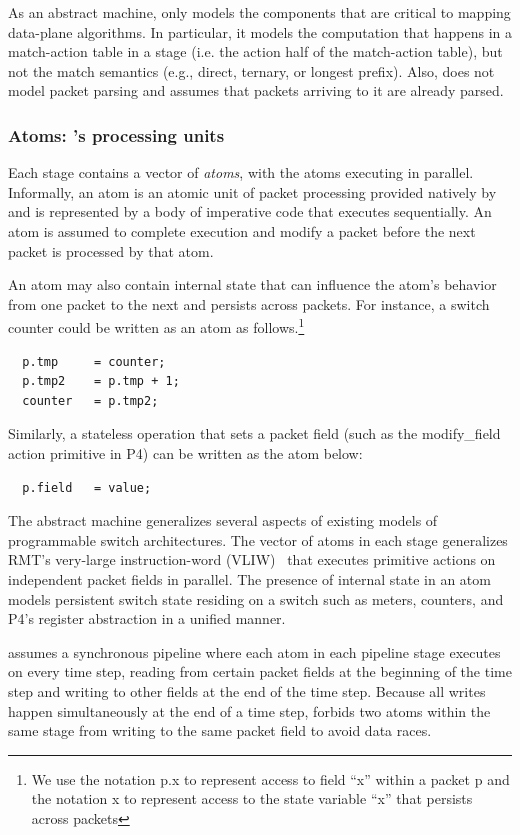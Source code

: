 As an abstract machine, \absmachine only models the components that
are critical to mapping data-plane algorithms. In particular, it
models the computation that happens in a match-action table in a stage
(i.e. the action half of the match-action table), but not the match
semantics (e.g., direct, ternary, or longest prefix). Also,
\absmachine does not model packet parsing and assumes that packets
arriving to it are already parsed.


\subsubsection{Atoms: \absmachine's processing units}

Each stage contains a vector of \textit{atoms}, with the atoms
executing in parallel. Informally, an atom is an atomic unit of packet
processing provided natively by \absmachine and is represented by a body of imperative code that
executes sequentially. An atom is assumed to complete execution and
modify a packet before the next packet is processed by that
atom.

An atom may also contain internal state that can influence the atom's
behavior from one packet to the next and persists across packets. For
instance, a switch counter could be written as an atom as
follows.\footnote{We use the notation p.x to represent access to field
  ``x'' within a packet p and the notation x to represent access to
  the state variable ``x'' that persists across packets}
\begin{verbatim}
  p.tmp     = counter;
  p.tmp2    = p.tmp + 1;
  counter   = p.tmp2;
\end{verbatim}
Similarly, a stateless operation that sets a packet field (such as the
modify\_field action primitive in P4) can be written as the atom
below:
\begin{verbatim}
  p.field   = value;
\end{verbatim}

The \absmachine abstract machine generalizes several aspects of
existing models of programmable switch architectures. The vector of
atoms in each stage generalizes RMT's very-large instruction-word
(VLIW)~\cite{rmt} that executes primitive actions on independent
packet fields in parallel. The presence of internal state in an atom
models persistent switch state residing on a switch such as meters,
counters, and P4's register abstraction in a unified manner.

\smallskip
{}
\absmachine assumes a synchronous pipeline where each atom in each pipeline
stage executes on every time step, reading from certain packet fields at the
beginning of the time step and writing to other fields at the end of the time
step. Because all writes happen simultaneously at the end of a time step,
\absmachine forbids two atoms within the same stage from writing to the same
packet field to avoid data races.

